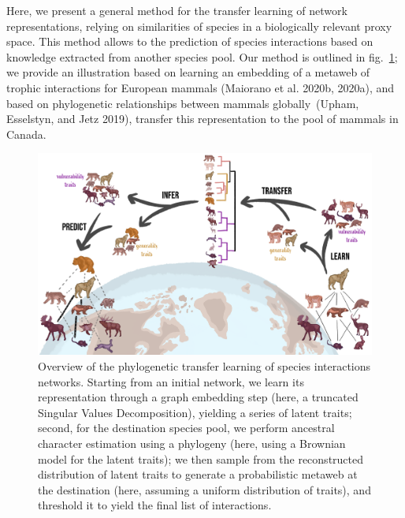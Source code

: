 \documentclass[11pt]{article}
\makeatletter
\def\maxwidth{\ifdim\Gin@nat@width>\linewidth\linewidth
\else\Gin@nat@width\fi}
\let\Oldincludegraphics\includegraphics
\renewcommand{\includegraphics}[1]{\Oldincludegraphics[width=\maxwidth]{#1}}
\makeatother
\begin{document}
Here, we present a general method for the transfer learning of network
representations, relying on similarities of species in a biologically
relevant proxy space. This method allows to the prediction of species
interactions based on knowledge extracted from another species pool. Our
method is outlined in fig.~\ref{fig:concept}; we provide an illustration
based on learning an embedding of a metaweb of trophic interactions for
European mammals (Maiorano et al. 2020b, 2020a), and based on
phylogenetic relationships between mammals globally~(Upham, Esselstyn,
and Jetz 2019), transfer this representation to the pool of mammals in
Canada.

\begin{figure}
\hypertarget{fig:concept}{%
\centering
\includegraphics{figures/figure-concept.png}
\caption{Overview of the phylogenetic transfer learning of species
interactions networks. Starting from an initial network, we learn its
representation through a graph embedding step (here, a truncated
Singular Values Decomposition), yielding a series of latent traits;
second, for the destination species pool, we perform ancestral character
estimation using a phylogeny (here, using a Brownian model for the
latent traits); we then sample from the reconstructed distribution of
latent traits to generate a probabilistic metaweb at the destination
(here, assuming a uniform distribution of traits), and threshold it to
yield the final list of interactions.}\label{fig:concept}
}
\end{figure}
\end{document}
